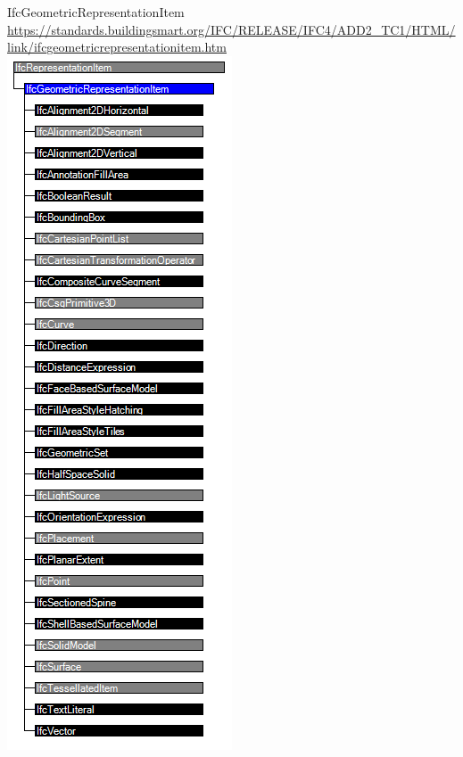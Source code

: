 \documentclass[spanish,12pt,a4paper,final,oneside]{book}
\begin{document}
IfcGeometricRepresentationItem
\\ \url{https://standards.buildingsmart.org/IFC/RELEASE/IFC4/ADD2_TC1/HTML/link/ifcgeometricrepresentationitem.htm}
\\ \includegraphics[scale=0.63]{jerarquia de IfcGeometricRepresentationItem}
\end{document}
